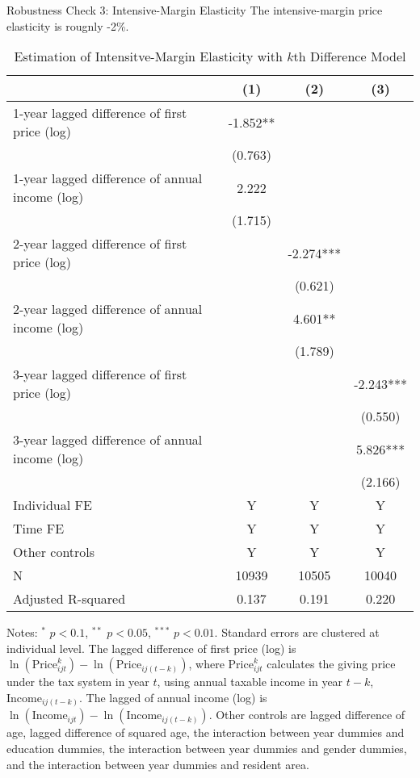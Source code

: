 \documentclass[
  ignorenonframetext,
  aspectratio=169,
]{beamer}
\begin{document}
\begin{frame}{Robustness Check 3: Intensive-Margin Elasticity}
\protect\hypertarget{robustness-check-3-intensive-margin-elasticity}{}
The intensive-margin price elasticity is rougnly -2\%.

\begin{table}

\caption{\label{tab:kdiffIntensive}Estimation of Intensitve-Margin Elasticity with $k$th Difference Model}
\centering
\fontsize{7}{9}\selectfont
\begin{threeparttable}
\begin{tabular}[t]{lccc}
\toprule
 & (1) & (2) & (3)\\
\midrule
1-year lagged difference of first price (log) & -1.852** &  & \\
 & (0.763) &  & \\
1-year lagged difference of annual income (log) & 2.222 &  & \\
 & (1.715) &  & \\
2-year lagged difference of first price (log) &  & -2.274*** & \\
 &  & (0.621) & \\
2-year lagged difference of annual income (log) &  & 4.601** & \\
 &  & (1.789) & \\
3-year lagged difference of first price (log) &  &  & -2.243***\\
 &  &  & (0.550)\\
3-year lagged difference of annual income (log) &  &  & 5.826***\\
 &  &  & (2.166)\\
Individual FE & Y & Y & Y\\
Time FE & Y & Y & Y\\
Other controls & Y & Y & Y\\
N & 10939 & 10505 & 10040\\
Adjusted R-squared & 0.137 & 0.191 & 0.220\\
\bottomrule
\end{tabular}
\begin{tablenotes}
\item Notes: $^{*}$ $p < 0.1$, $^{**}$ $p < 0.05$, $^{***}$ $p < 0.01$. Standard errors are clustered at individual level. The lagged difference of first price (log) is $\ln(\text{Price}^k_{ijt}) - \ln(\text{Price}_{ij(t-k)})$, where $\text{Price}^k_{ijt}$ calculates the giving price under the tax system in year $t$, using annual taxable income in year $t-k$, $\text{Income}_{ij(t-k)}$. The lagged of annual income (log) is $\ln(\text{Income}_{ijt}) - \ln(\text{Income}_{ij(t-k)})$. Other controls are lagged difference of age, lagged difference of squared age, the interaction between year dummies and education dummies, the interaction between year dummies and gender dummies, and the interaction between year dummies and resident area.
\end{tablenotes}
\end{threeparttable}
\end{table}
\end{frame}
\end{document}
